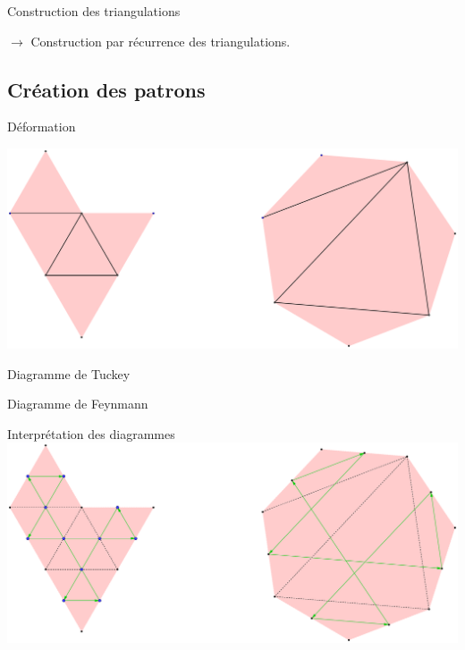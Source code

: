 \documentclass[french,xcolor=dvipsnames]{beamer}
\begin{document}
\begin{frame}{Construction des triangulations}
\begin{figure}
			\end{figure}
		$\rightarrow$ Construction par récurrence des triangulations.\\
		\end{frame}
		
		\subsection{Création des patrons}
		
		\begin{frame}{Déformation}
			\begin{center}
				\includegraphics[scale=0.08]{equiv_tuckey_feynmann.eps}
			\end{center}
			\begin{flushleft}
				Diagramme de Tuckey
			\end{flushleft}
			\begin{flushright}
				Diagramme de Feynmann
			\end{flushright}
		\end{frame}
		
		\begin{frame}{Interprétation des diagrammes}
			\includegraphics[scale=0.08]{conversion_tuckey_patron_1.eps}
		\end{frame}
\end{document}
